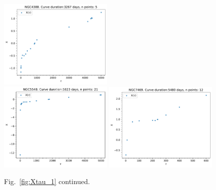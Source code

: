 \begin{figure}
\begin{center}
{  \includegraphics[width=0.49\textwidth]{Figs/Chapter5/X_tau_NGC4388.pdf} \\
  \includegraphics[width=0.49\textwidth]{Figs/Chapter5/X_tau_NGC5548.pdf} \hfill 
  \includegraphics[width=0.49\textwidth]{Figs/Chapter5/X_tau_NGC7469.pdf}  
  \caption{Fig.~\ref{fig:Xtau_1} continued.}
    \label{fig:Xtau_2}
  }
\end{center}
\end{figure}

